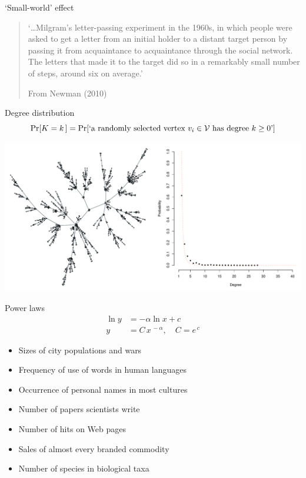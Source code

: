 \begin{frame}{`Small-world' effect}
    \vfill
    \begin{quotation}
        `\ldots Milgram's letter\hyp{}passing experiment in the 1960s, in which
        people were asked to get a letter from an initial holder to a distant
        target person by passing it from acquaintance to acquaintance through
        the social network.
        The letters that made it to the target did so in a remarkably small
        number of steps, around six on average.'

        \begin{flushright}
            \scriptsize%
            From Newman (2010)
        \end{flushright}
    \end{quotation}
    \vfill
\end{frame}

\begin{frame}{Degree distribution}
    \[
        \Pr\!\left[ K = k \,\right]
        = \Pr\!\left[ \text{`a randomly selected vertex $v_{i} \in \mathcal{V}$ has degree $k \geq 0$'} \right]
    \]
    \begin{center}
        \includegraphics[height=0.65\textheight]{figures/degree_dist}
    \end{center}
\end{frame}

\begin{frame}{Power laws}
    \begin{align*}
        \ln y &= - \alpha \ln x + c \\
        y &= C\,x^{\,-\alpha}, \quad C = e^{\,c}
    \end{align*}
    \vfill
    \begin{itemize}
        \item Sizes of city populations and wars
        \item Frequency of use of words in human languages
        \item Occurrence of personal names in most cultures
        \item Number of papers scientists write
        \item Number of hits on Web pages
        \item Sales of almost every branded commodity
        \item Number of species in biological taxa
    \end{itemize}
\end{frame}

